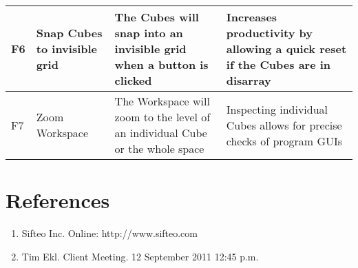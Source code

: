 \documentclass[12pt]{article}
\begin{document}
\begin{landscape}
\begin{table}[h]
\begin{tabular}{p{.5in} | p{2.25in} | p{2.75in} | p{3in}}
        F6 &
        Snap Cubes to invisible grid &
        The Cubes will snap into an invisible grid when a button is clicked &
        Increases productivity by allowing a quick reset if the Cubes are in disarray
        \\ \hline

        F7 &
        Zoom Workspace &
        The Workspace will zoom to the level of an individual Cube or the whole space &
        Inspecting individual Cubes allows for precise checks of program \glspl{GUI}\index{GUI}\glsadd{GUIa}
        \\ \hline

      \end{tabular}
    \end{table}
    \end{landscape}


\clearpage
{}
\printglossaries
\clearpage

\section*{References}

        \begin{enumerate}
                \item{Sifteo Inc. Online: http://www.sifteo.com}
                \item{Tim Ekl.  Client Meeting.  12 September 2011 12:45 p.m.}
        \end{enumerate}

\clearpage

\printindex
\end{document}
